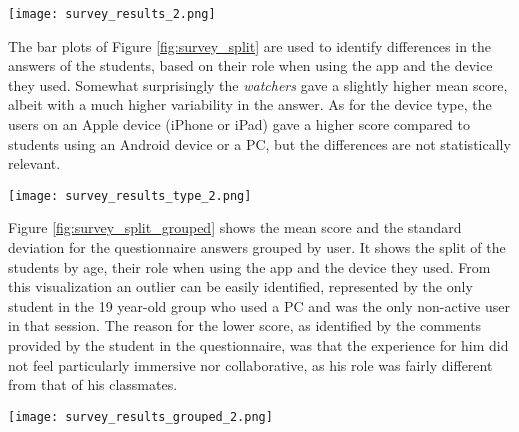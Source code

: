 \begin{figure*}[htbp]
    \centering
    \texttt{[image: survey\_results\_2.png]}
    \caption{\fontsize{10pt}{11pt}}
    \label{fig:survey_all}
\end{figure*}

The bar plots of Figure \ref{fig:survey_split} are used to identify differences in the answers of the students, based on their role when using the app and the device they used.
Somewhat surprisingly the \textit{watchers} gave a slightly higher mean score, albeit with a much higher variability in the answer.
As for the device type, the users on an Apple device (iPhone or iPad) gave a higher score compared to students using an Android device or a PC, but the differences are not statistically relevant.

\begin{figure*}[htbp]
    \centering
    \texttt{[image: survey\_results\_type\_2.png]}
    \caption{\fontsize{10pt}{11pt}}
    \label{fig:survey_split}
\end{figure*}

Figure \ref{fig:survey_split_grouped} shows the mean score and the standard deviation for the questionnaire answers grouped by user.
It shows the split of the students by age, their role when using the app and the device they used.
From this visualization an outlier can be easily identified, represented by the only student in the 19 year-old group who used a PC and was the only non-active user in that session.
The reason for the lower score, as identified by the comments provided by the student in the questionnaire, was that the experience for him did not feel particularly immersive nor collaborative, as his role was fairly different from that of his classmates. 

\begin{figure*}[htbp]
    \centering
    \texttt{[image: survey\_results\_grouped\_2.png]}
    \caption{\fontsize{10pt}{11pt}}
    \label{fig:survey_split_grouped}
\end{figure*}

